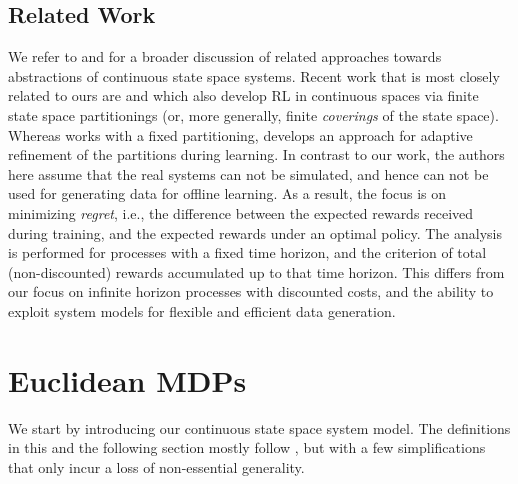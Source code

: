 \documentclass{llncs}
\begin{document}
\subsection*{Related Work}


We refer to  \cite{ATVA19} and \cite{jaeger2020approximating} for a broader discussion of related
approaches towards abstractions of continuous state space systems. Recent work that is
most closely related to ours are \cite{song2019efficient} and \cite{sinclair2019adaptive} which
also develop RL in continuous spaces via finite state space partitionings (or, more generally,
finite \emph{coverings} of the state space). Whereas \cite{song2019efficient} works with a fixed partitioning,
\cite{sinclair2019adaptive} develops an approach for adaptive refinement of the partitions during learning.
In contrast to our work, the authors here assume that the
real systems can not be simulated, and hence can not be used for generating data for offline learning.
As a result, the focus is on minimizing \emph{regret}, i.e., the difference between the
expected   rewards received during training, and the expected rewards under an optimal policy. The analysis
is performed for processes with a fixed time horizon, and the criterion of total (non-discounted) rewards
accumulated up to that time horizon. This differs from our focus on infinite horizon processes with
discounted costs, and the
ability to exploit system models for flexible and efficient data generation. 


\section{Euclidean MDPs}

We start by introducing our continuous state space system model. The definitions in this and the
following section mostly follow \cite{jaeger2020approximating}, but with a few simplifications
that only incur a loss of non-essential generality.
\end{document}
